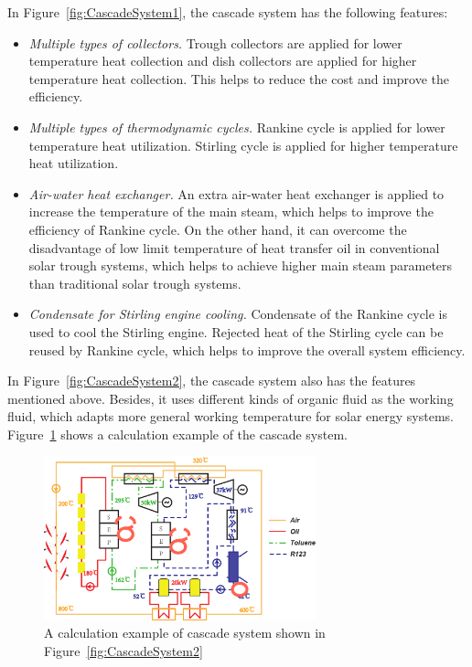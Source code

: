 In Figure~\ref{fig:CascadeSystem1}, the cascade system has the following features:

\begin{itemize}
  \item \emph{Multiple types of collectors.} Trough collectors are applied for lower temperature heat collection and dish collectors are applied for higher temperature heat collection. This helps to reduce the cost and improve the efficiency.
  \item \emph{Multiple types of thermodynamic cycles.} Rankine cycle is applied for lower temperature heat utilization. Stirling cycle is applied for higher temperature heat utilization.
  \item \emph{Air-water heat exchanger.} An extra air-water heat exchanger is applied to increase the temperature of the main steam, which helps to improve the efficiency of Rankine cycle. On the other hand, it can overcome the disadvantage of low limit temperature of heat transfer oil in conventional solar trough systems, which helps to achieve higher main steam parameters than traditional solar trough systems. 
  \item \emph{Condensate for Stirling engine cooling.} Condensate of the Rankine cycle is used to cool the Stirling engine. Rejected heat of the Stirling cycle can be reused by Rankine cycle, which helps to improve the overall system efficiency.
\end{itemize}

In Figure~\ref{fig:CascadeSystem2}, the cascade system also has the features mentioned above. Besides, it uses different kinds of organic fluid as the working fluid, which adapts more general working temperature for solar energy systems. Figure~\ref{fig:Ex_CascadeSystem2} shows a calculation example of the cascade system.

\begin{figure}[!ht]
\centering 
\includegraphics[width=0.7\textwidth]{fig/Ex_CascadeSystem2}
\caption{A calculation example of cascade system shown in Figure~\ref{fig:CascadeSystem2}}
\label{fig:Ex_CascadeSystem2}
\end{figure}

